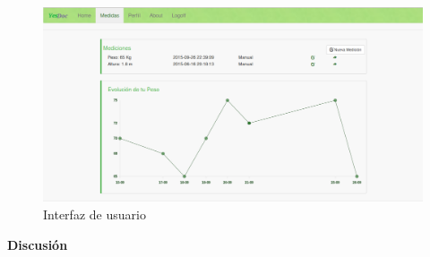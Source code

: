 \documentclass[a4paper,twocolumn,12pt]{article}
\begin{document}

\begin{figure}
  \centering
  \includegraphics[width=.5\textwidth]{graph}
  \caption{Interfaz de usuario}
  \label{graph}
\end{figure}

\vspace{3mm}
\textbf{Discusión}

\end{document}
